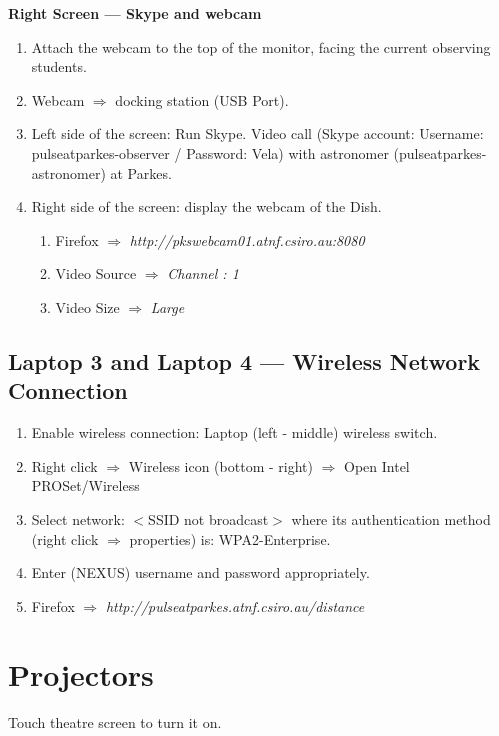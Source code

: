 \documentclass{article}
\begin{document}
\textbf{Right Screen --- Skype and webcam}
\begin{enumerate}
\item Attach the webcam to the top of the monitor, facing the current observing students.
\item Webcam $\Rightarrow$ docking station (USB Port).
\item Left side of the screen: Run Skype. Video call (Skype account: Username: pulseatparkes-observer / Password: Vela) with astronomer (pulseatparkes-astronomer) at Parkes.
\item Right side of the screen: display the webcam of the Dish.
\begin{enumerate}
\item Firefox $\Rightarrow$ \emph{http://pkswebcam01.atnf.csiro.au:8080}
\item Video Source $\Rightarrow$ \emph{Channel : 1}
\item Video Size $\Rightarrow$ \emph{Large}
\end{enumerate}
\end{enumerate}

\subsection*{Laptop 3 and Laptop 4 --- Wireless Network Connection}
\begin{enumerate}
\item Enable wireless connection: Laptop (left - middle) wireless switch.
\item Right click $\Rightarrow$ Wireless icon (bottom - right) $\Rightarrow$ Open Intel PROSet/Wireless
\item Select network: $<$SSID not broadcast$>$ where its authentication method (right click $\Rightarrow$ properties) is: WPA2-Enterprise.
\item Enter (NEXUS) username and password appropriately.
\item Firefox $\Rightarrow$ \emph{http://pulseatparkes.atnf.csiro.au/distance}
\end{enumerate}


\section{Projectors}
Touch theatre screen to turn it on.
\end{document}
